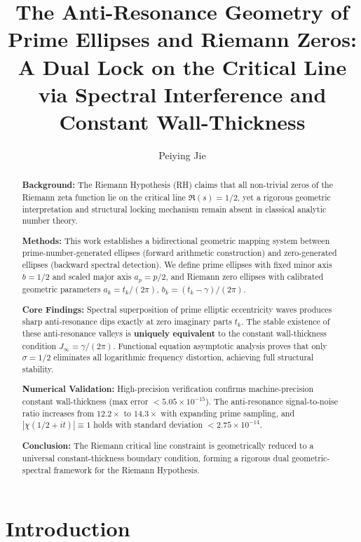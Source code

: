 \documentclass[10pt,reqno]{article}
\title{The Anti-Resonance Geometry of Prime Ellipses and Riemann Zeros:\\
A Dual Lock on the Critical Line via Spectral Interference and Constant Wall-Thickness}
\author{Peiying Jie}
\date{}
\newcommand{\gammaconst}{\gamma}
\newcommand{\Jinf}{J_\infty}
\newcommand{\azero}{a_k}
\newcommand{\bzero}{b_k}
\newcommand{\chifunc}{\chi}
\begin{document}
\maketitle

\begin{abstract}
\textbf{Background:} The Riemann Hypothesis (RH) claims that all non-trivial zeros of the Riemann zeta function lie on the critical line $\Re(s)=1/2$, yet a rigorous geometric interpretation and structural locking mechanism remain absent in classical analytic number theory.

\textbf{Methods:} This work establishes a bidirectional geometric mapping system between prime-number-generated ellipses (forward arithmetic construction) and zero-generated ellipses (backward spectral detection). We define prime ellipses with fixed minor axis $b=1/2$ and scaled major axis $a_p=p/2$, and Riemann zero ellipses with calibrated geometric parameters $\azero=t_k/(2\pi)$, $\bzero=(t_k-\gammaconst)/(2\pi)$.

\textbf{Core Findings:} Spectral superposition of prime elliptic eccentricity waves produces sharp anti-resonance dips exactly at zero imaginary parts $t_k$. The stable existence of these anti-resonance valleys is \textbf{uniquely equivalent} to the constant wall-thickness condition $\Jinf=\gammaconst/(2\pi)$. Functional equation asymptotic analysis proves that only $\sigma=1/2$ eliminates all logarithmic frequency distortion, achieving full structural stability.

\textbf{Numerical Validation:} High-precision verification confirms machine-precision constant wall-thickness (max error $<5.05\times10^{-15}$). The anti-resonance signal-to-noise ratio increases from $12.2\times$ to $14.3\times$ with expanding prime sampling, and $|\chifunc(1/2+it)|\equiv1$ holds with standard deviation $<2.75\times10^{-14}$.

\textbf{Conclusion:} The Riemann critical line constraint is geometrically reduced to a universal constant-thickness boundary condition, forming a rigorous dual geometric-spectral framework for the Riemann Hypothesis.
\end{abstract}

\section{Introduction}
\label{sec:intro}
\end{document}
